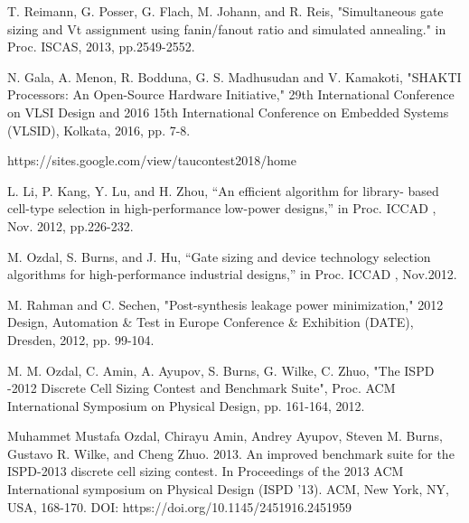 \begin{thebibliography}{1}
T. Reimann, G. Posser, G. Flach, M. Johann, and R. Reis, "Simultaneous gate sizing and Vt assignment using fanin/fanout ratio and simulated annealing." in Proc. ISCAS, 2013, pp.2549-2552.

N. Gala, A. Menon, R. Bodduna, G. S. Madhusudan and V. Kamakoti, "SHAKTI Processors: An Open-Source Hardware Initiative," 29th International Conference on VLSI Design and 2016 15th International Conference on Embedded Systems (VLSID), Kolkata, 2016, pp. 7-8.


https://sites.google.com/view/taucontest2018/home

L. Li, P. Kang, Y. Lu, and H. Zhou, “An efficient algorithm for library-
based cell-type selection in high-performance low-power designs,” in
Proc. ICCAD , Nov. 2012, pp.226-232.

 


M. Ozdal, S. Burns, and J. Hu, “Gate sizing and device technology selection algorithms for high-performance industrial designs,” in Proc. ICCAD , Nov.2012.




 
 
M. Rahman and C. Sechen, "Post-synthesis leakage power minimization," 2012 Design, Automation \& Test in Europe Conference \& Exhibition (DATE), Dresden, 2012, pp. 99-104. 









%


M. M. Ozdal, C. Amin, A. Ayupov, S. Burns, G. Wilke, C. Zhuo, "The ISPD -2012 Discrete Cell Sizing Contest and Benchmark Suite", Proc. ACM International Symposium on Physical Design, pp. 161-164, 2012.

Muhammet Mustafa Ozdal, Chirayu Amin, Andrey Ayupov, Steven M. Burns, Gustavo R. Wilke, and Cheng Zhuo. 2013. An improved benchmark suite for the ISPD-2013 discrete cell sizing contest. In Proceedings of the 2013 ACM International symposium on Physical Design (ISPD '13). ACM, New York, NY, USA, 168-170. DOI: https://doi.org/10.1145/2451916.2451959






\end{thebibliography}
